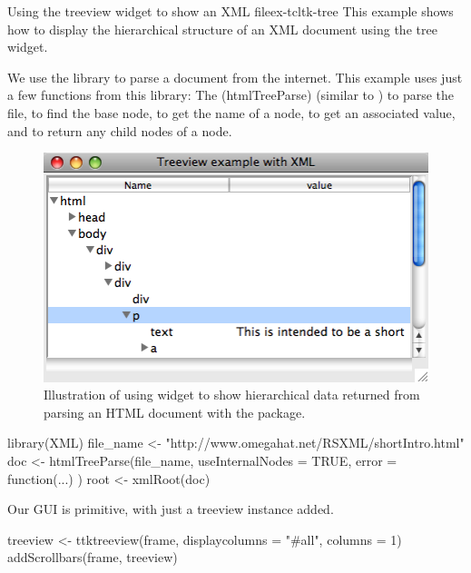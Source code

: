 \begin{example}{Using the treeview widget to show an XML file}{ex-tcltk-tree}
This example shows how to display the hierarchical structure of an XML
document using the tree widget.

We use the  library to parse a document from the
internet. This example uses just a few functions from this library:
The \function(htmlTreeParse) (similar to ) to parse the file, 
 to find the base node,
 to get the name of a node, 
 to get an associated value, and
 to return any child nodes of a node.



\begin{figure}
  \centering
  \includegraphics[width=.7\textwidth]{fig-tcltk-xml-viewer.png}
  \caption{Illustration of using  widget to show
    hierarchical data returned from parsing an HTML document with the
     package.}
  \label{fig:fig-tcltk-xml-viewer}
\end{figure}
\begin{Schunk}
\begin{Sinput}
 library(XML)
 file_name <- "http://www.omegahat.net/RSXML/shortIntro.html"
 doc <- htmlTreeParse(file_name, useInternalNodes = TRUE, 
                      error = function(...) {})
 root <- xmlRoot(doc)
\end{Sinput}
\end{Schunk}
Our GUI is primitive, with just a treeview instance added.
\begin{Schunk}
\begin{Sinput}
 treeview <- ttktreeview(frame, displaycolumns = "#all", 
                         columns = 1)
 addScrollbars(frame, treeview)                    
\end{Sinput}
\end{Schunk}


\end{example}
